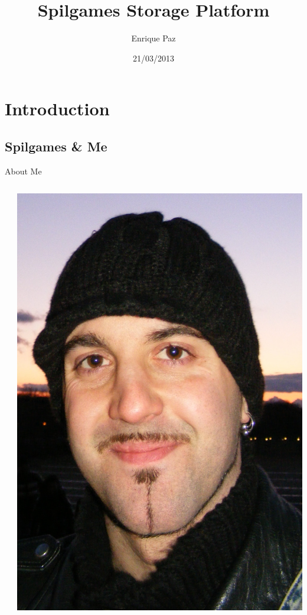 \documentclass[aspectratio=43]{beamer}
\title[]{\alert{Spilgames Storage Platform}}
\author[]{Enrique Paz}
\institute[] %
{Senior Backend Developer}
\date[]{21/03/2013}
\begin{document}
\begin{frame}
    \titlepage
\end{frame}

\section{Introduction}
\subsection{Spilgames \& Me}

\begin{frame}{About Me}
    \begin{columns}
        \begin{column}[c]{0.05\textwidth}
        \end{column}
        \begin{column}[c]{0.2\textwidth}
            \includegraphics[width=\textwidth]{images/me.png}

\end{column}
\end{columns}
\end{frame}
\end{document}
